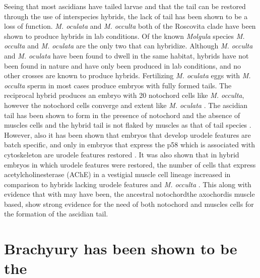 Seeing that most ascidians have tailed larvae and that the tail can be restored through the use of interspecies hybrids, the lack of tail has been shown to be a loss of function. \textit{M. oculata} and \textit{M. occulta} both of the Roscovita clade have been shown to produce hybrids in lab conditions. Of the known \textit{Molgula} species \textit{M. occulta} and \textit{M. oculata} are the only two that can hybridize. Although \textit{M. occulta} and \textit{M. oculata} have been found to dwell in the same habitat, hybrids have not been found in nature and have only been produced in lab conditions, and no other crosses are known to produce hybrids. Fertilizing \textit{M. oculata} eggs with \textit{M. occulta} sperm in most cases produce embryos with fully formed tails. The reciprocal hybrid produces an embryo with 20 notochord cells like \textit{M. occulta}, however the notochord cells converge and extent like \textit{M. oculata} \cite{swalla_interspecific_1990}. The ascidian tail has been shown to form in the presence of notochord and the absence of muscles cells \cite{miyamoto_formation_1985} and the hybrid tail is not flaked by muscles as that of tail species \cite{swalla_novel_1993}. However, also it has been shown that embryos that develop urodele features are batch specific, and only in embryos that express the p58 which is associated with cytoskeleton are urodele features restored \cite{swalla_identification_1991,jeffery_factors_1992}. It was also shown that in hybrid embryos in which urodele features were restored, the number of cells that express acetylcholinesterase (AChE) in a vestigial muscle cell lineage increased in comparison to hybrids lacking urodele features and \textit{M. occulta} \cite{jeffery_evolutionary_1991}. This along with evidence that with may have been, the ancestral notochord\textemdash the axochord\textemdash is muscle based, show strong evidence for the need of both notochord and muscles cells for the formation of the ascidian tail. 

\section{Brachyury has been shown to be the  }

